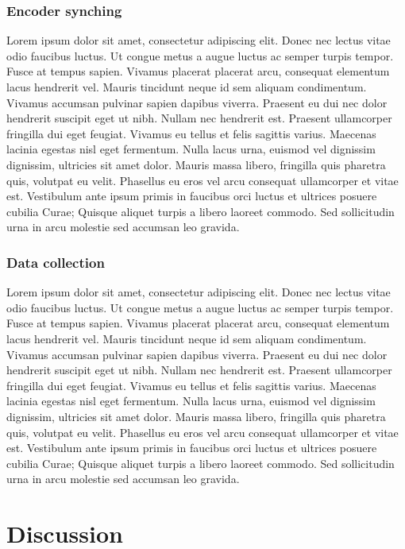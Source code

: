 \documentclass{article}
\begin{document}
\subsubsection{Encoder synching}
Lorem ipsum dolor sit amet, consectetur adipiscing elit. Donec nec lectus vitae odio faucibus luctus. Ut congue metus a augue luctus ac semper turpis tempor. Fusce at tempus sapien. Vivamus placerat placerat arcu, consequat elementum lacus hendrerit vel. Mauris tincidunt neque id sem aliquam condimentum. Vivamus accumsan pulvinar sapien dapibus viverra. Praesent eu dui nec dolor hendrerit suscipit eget ut nibh. Nullam nec hendrerit est. Praesent ullamcorper fringilla dui eget feugiat. Vivamus eu tellus et felis sagittis varius. Maecenas lacinia egestas nisl eget fermentum. Nulla lacus urna, euismod vel dignissim dignissim, ultricies sit amet dolor. Mauris massa libero, fringilla quis pharetra quis, volutpat eu velit. Phasellus eu eros vel arcu consequat ullamcorper et vitae est. Vestibulum ante ipsum primis in faucibus orci luctus et ultrices posuere cubilia Curae; Quisque aliquet turpis a libero laoreet commodo. Sed sollicitudin urna in arcu molestie sed accumsan leo gravida.


\subsubsection{Data collection}
Lorem ipsum dolor sit amet, consectetur adipiscing elit. Donec nec lectus vitae odio faucibus luctus. Ut congue metus a augue luctus ac semper turpis tempor. Fusce at tempus sapien. Vivamus placerat placerat arcu, consequat elementum lacus hendrerit vel. Mauris tincidunt neque id sem aliquam condimentum. Vivamus accumsan pulvinar sapien dapibus viverra. Praesent eu dui nec dolor hendrerit suscipit eget ut nibh. Nullam nec hendrerit est. Praesent ullamcorper fringilla dui eget feugiat. Vivamus eu tellus et felis sagittis varius. Maecenas lacinia egestas nisl eget fermentum. Nulla lacus urna, euismod vel dignissim dignissim, ultricies sit amet dolor. Mauris massa libero, fringilla quis pharetra quis, volutpat eu velit. Phasellus eu eros vel arcu consequat ullamcorper et vitae est. Vestibulum ante ipsum primis in faucibus orci luctus et ultrices posuere cubilia Curae; Quisque aliquet turpis a libero laoreet commodo. Sed sollicitudin urna in arcu molestie sed accumsan leo gravida.

\section{Discussion}
\label{sec:discussion}
\end{document}
